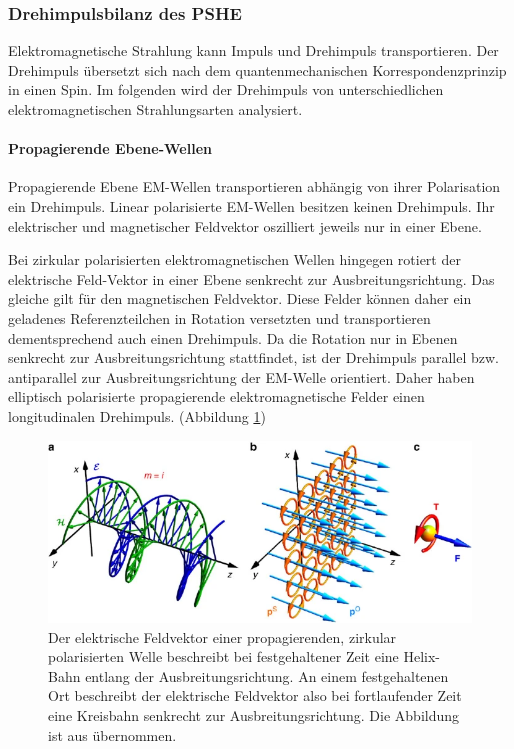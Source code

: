 \documentclass[titlepage,  ngerman]{article}
\begin{document}
	
	
	\subsubsection{Drehimpulsbilanz des PSHE}
	\label{sec:spin_spp}
	Elektromagnetische Strahlung kann Impuls und Drehimpuls transportieren. Der Drehimpuls übersetzt sich nach dem quantenmechanischen Korrespondenzprinzip in einen Spin. Im folgenden wird der Drehimpuls von unterschiedlichen elektromagnetischen Strahlungsarten analysiert.
	\paragraph{Propagierende Ebene-Wellen}
	Propagierende Ebene EM-Wellen transportieren abhängig von ihrer Polarisation ein Drehimpuls. Linear polarisierte EM-Wellen besitzen keinen Drehimpuls. Ihr elektrischer und magnetischer Feldvektor oszilliert jeweils nur in einer Ebene.
	
	Bei zirkular polarisierten elektromagnetischen Wellen hingegen rotiert der elektrische Feld-Vektor in einer Ebene senkrecht zur Ausbreitungsrichtung. Das gleiche gilt für den magnetischen Feldvektor. Diese Felder können daher ein geladenes Referenzteilchen in Rotation versetzten und transportieren dementsprechend auch einen Drehimpuls. Da die Rotation nur in Ebenen senkrecht zur Ausbreitungsrichtung stattfindet, ist der Drehimpuls parallel bzw. antiparallel zur Ausbreitungsrichtung der EM-Welle orientiert. Daher haben elliptisch polarisierte propagierende elektromagnetische Felder einen longitudinalen Drehimpuls. (Abbildung \ref{fig:prop_spin})
	
	\begin{figure}[h]
		\centering
		\includegraphics[width=0.7\linewidth]{figures/spin/prop_spin}
		\caption[Drehimpuls von propagierender EM-Welle]{Der elektrische Feldvektor einer propagierenden, zirkular polarisierten Welle beschreibt bei festgehaltener Zeit eine Helix-Bahn entlang der Ausbreitungsrichtung. An einem festgehaltenen Ort beschreibt der elektrische Feldvektor also bei fortlaufender Zeit eine Kreisbahn senkrecht zur Ausbreitungsrichtung. Die Abbildung ist aus \cite{Bliokh.2014} übernommen.}
		\label{fig:prop_spin}
	\end{figure}
	
\end{document}
